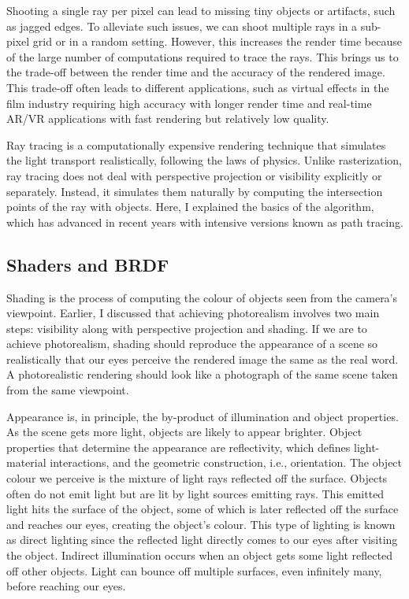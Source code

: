 Shooting a single ray per pixel can lead to missing tiny objects or artifacts, such as jagged edges. To alleviate such issues, we can shoot multiple rays in a sub-pixel grid or in a random setting. However, this increases the render time because of the large number of computations required to trace the rays. This brings us to the trade-off between the render time and the accuracy of the rendered image. This trade-off often leads to different applications, such as virtual effects in the film industry requiring high accuracy with longer render time and real-time \gls{AR/VR} applications with fast rendering but relatively low quality.

Ray tracing is a computationally expensive rendering technique that simulates the light transport realistically, following the laws of physics. Unlike rasterization, ray tracing does not deal with perspective projection or visibility explicitly or separately. Instead, it simulates them naturally by computing the intersection points of the ray with objects. Here, I explained the basics of the algorithm, which has advanced in recent years with intensive versions known as path tracing. 

\subsection{Shaders and BRDF}

Shading is the process of computing the colour of objects seen from the camera's viewpoint. Earlier, I discussed that achieving photorealism involves two main steps:  visibility along with perspective projection and shading. If we are to achieve photorealism, shading should reproduce the appearance of a scene so realistically that our eyes perceive the rendered image the same as the real word. A photorealistic rendering should look like a photograph of the same scene taken from the same viewpoint. 

Appearance is, in principle, the by-product of illumination and object properties. As the scene gets more light, objects are likely to appear brighter. Object properties that determine the appearance are reflectivity, which defines light-material interactions, and the geometric construction, i.e., orientation. The object colour we perceive is the mixture of light rays reflected off the surface. Objects often do not emit light but are lit by light sources emitting rays. This emitted light hits the surface of the object, some of which is later reflected off the surface and reaches our eyes, creating the object's colour. This type of lighting is known as direct lighting since the reflected light directly comes to our eyes after visiting the object. Indirect illumination occurs when an object gets some light reflected off other objects. Light can bounce off multiple surfaces, even infinitely many, before reaching our eyes.

